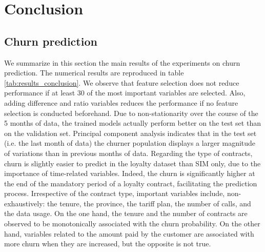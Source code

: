 \chapter{Conclusion}

\section{Churn prediction}

We summarize in this section the main results of the experiments on churn
prediction. The numerical results are reproduced in table
\ref{tab:results_conclusion}. We observe that feature selection does not reduce
performance if at least 30 of the most important variables are selected. Also,
adding difference and ratio variables reduces the performance if no feature
selection is conducted beforehand. Due to non-stationarity over the course of
the 5 months of data, the trained models actually perform better on the test set
than on the validation set. Principal component analysis indicates that in the
test set (i.e. the last month of data) the churner population displays a larger
magnitude of variations than in previous months of data. Regarding the type of
contracts, churn is slightly easier to predict in the loyalty dataset than SIM
only, due to the importance of time-related variables. Indeed, the churn is
significantly higher at the end of the mandatory period of a loyalty contract,
facilitating the prediction process. Irrespective of the contract type,
important variables include, non-exhaustively: the tenure, the province, the
tariff plan, the number of calls, and the data usage. On the one hand, the
tenure and the number of contracts are observed to be monotonically associated with
the churn probability. On the other hand, variables related to the amount paid
by the customer are associated with more churn when they are increased, but the
opposite is not true.

